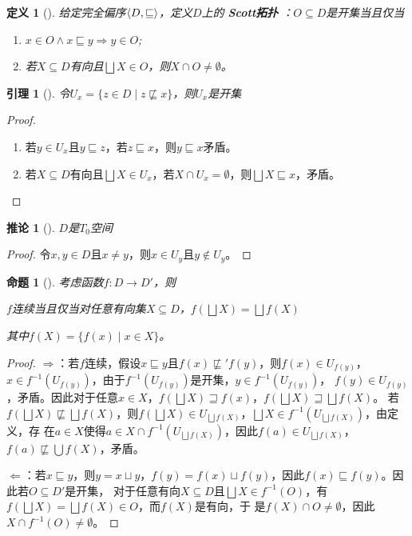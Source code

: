 \documentclass{jams-l}
\newtheorem{corollary}[theorem]{推论}
\newtheorem{proposition}[theorem]{命题}
\newtheorem{lemma}[theorem]{引理}
\newtheorem{definition}[theorem]{定义}
\begin{document}
\begin{definition}[]
给定完全偏序\(\langle D,\sqsubseteq\rangle\)，定义\(D\)上的 \textbf{Scott拓扑} ：\(O\subseteq D\)是开集当且仅当
\begin{enumerate}
\item \(x\in O\wedge x\sqsubseteq y\Rightarrow y\in O\);
\item 若\(X\subseteq D\)有向且\(\bigsqcup X\in O\)，则\(X\cap O\neq\emptyset\)。
\end{enumerate}
\end{definition}

\begin{lemma}[]
令\(U_x=\{z\in D\mid z\not\sqsubseteq x\}\)，则\(U_x\)是开集
\end{lemma}

\begin{proof}
\begin{enumerate}
\item 若\(y\in U_x\)且\(y\sqsubseteq z\)，若\(z\sqsubseteq x\)，则\(y\sqsubseteq x\)矛盾。
\item 若\(X\subseteq D\)有向且\(\bigsqcup X\in U_x\)，若\(X\cap U_x=\emptyset\)，则\(\bigsqcup X\sqsubseteq x\)，矛盾。
\end{enumerate}
\end{proof}

\begin{corollary}[]
\(D\)是\(T_0\)空间
\end{corollary}

\begin{proof}
令\(x,y\in D\)且\(x\neq y\)，则\(x\in U_y\)且\(y\notin U_y\)。
\end{proof}

\begin{proposition}[]
考虑函数\(f:D\to D'\)，则
\begin{center}
\(f\)连续当且仅当对任意有向集\(X\subseteq D\)，\(f(\bigsqcup X)=\bigsqcup f(X)\)
\end{center}
其中\(f(X)=\{f(x)\mid x\in X\}\)。
\end{proposition}

\begin{proof}
\(\Rightarrow\)：若\(f\)连续，假设\(x\sqsubseteq y\)且\(f(x)\not\sqsubseteq' f(y)\)，则\(f(x)\in U_{f(y)}\)，
\(x\in f^{-1}(U_{f(y)})\)，由于\(f^{-1}(U_{f(y)})\)是开集，\(y\in f^{-1}(U_{f(y)})\)，
\(f(y)\in U_{f(y)}\)，矛盾。因此对于任意\(x\in X\)，\(f(\bigsqcup X)\sqsupseteq f(x)\)，\(f(\bigsqcup X)\sqsupseteq\bigsqcup f(X)\)。
若\(f(\bigsqcup X)\not\sqsubseteq\bigsqcup f(X)\)，则\(f(\bigsqcup X)\in U_{\bigsqcup f(X)}\)，\(\bigsqcup X\in f^{-1}(U_{\bigsqcup f(X)})\)，由定义，存
在\(a\in X\)使得\(a\in X\cap f^{-1}(U_{\bigsqcup f(X)})\)，因此\(f(a)\in U_{\bigsqcup f(X)}\)，\(f(a)\not\sqsubseteq\bigcup f(X)\)，矛盾。

\(\Leftarrow\)：若\(x\sqsubseteq y\)，则\(y=x\sqcup y\)，\(f(y)=f(x)\sqcup f(y)\)，因此\(f(x)\sqsubseteq f(y)\)。因此若\(O\subseteq D'\)是开集，
对于任意有向\(X\subseteq D\)且\(\bigsqcup X\in f^{-1}(O)\)，有\(f(\bigsqcup X)=\bigsqcup f(X)\in O\)，而\(f(X)\)是有向，于
是\(f(X)\cap O\neq\emptyset\)，因此\(X\cap f^{-1}(O)\neq\emptyset\)。
\end{proof}
\end{document}
